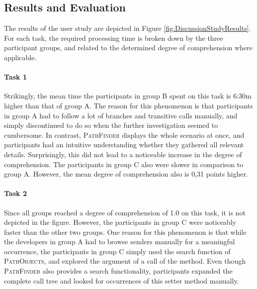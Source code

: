 \subsection{Results and Evaluation}
The results of the user study are depicted in Figure \ref{fig:DiscussionStudyResults}.
For each task, the required processing time is broken down by the three participant groups, and related to the determined degree of comprehension where applicable.

\paragraph{Task 1} Strikingly, the mean time the participants in group B spent on this task is 6:30m higher than that of group A.
The reason for this phenomenon is that participants in group A had to follow a lot of branches and transitive calls manually, and simply discontinued to do so when the further investigation seemed to cumbersome.
In contrast, \textsc{PathFinder} displays the whole scenario at once, and participants had an intuitive understanding whether they gathered all relevant details.
Surprisingly, this did not lead to a noticeable increase in the degree of comprehension.
The participants in group C also were slower in comparison to group A.
However, the mean degree of comprehension also is 0,31 points higher.

\paragraph{Task 2} Since all groups reached a degree of comprehension of 1.0 on this task, it is not depicted in the figure.
However, the participants in group C were noticeably faster than the other two groups. 
One reason for this phenomenon is that while the developers in group A had to browse senders manually for a meaningful occurrence, the participants in group C simply used the search function of \textsc{PathObjects}, and explored the argument of a call of the  method.
Even though \textsc{PathFinder} also provides a search functionality, participants expanded the complete call tree and looked for occurrences of this setter method manually.

